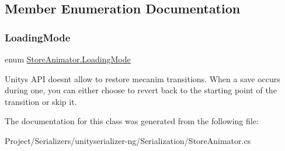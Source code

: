 \subsection{Member Enumeration Documentation}
\mbox{\label{class_store_animator_ab741d47aefde3f90b3d083632aac75e6}} 
\subsubsection{\texorpdfstring{Loading\+Mode}{LoadingMode}}
{\footnotesize\ttfamily enum \hyperlink{class_store_animator_ab741d47aefde3f90b3d083632aac75e6}{Store\+Animator.\+Loading\+Mode}\hspace{0.3cm}{\ttfamily [strong]}}



Unity\textquotesingle{}s A\+PI doesn\textquotesingle{}t allow to restore mecanim transitions. When a save occurs during one, you can either choose to revert back to the starting point of the transition or skip it. 



The documentation for this class was generated from the following file\+:\begin{DoxyCompactItemize}
\item 
Project/\+Serializers/unityserializer-\/ng/\+Serialization/Store\+Animator.\+cs\end{DoxyCompactItemize}
